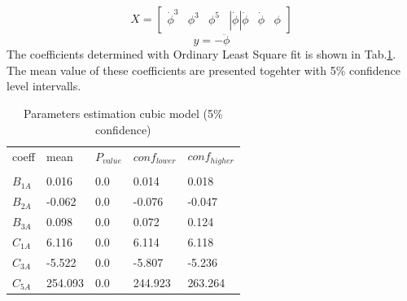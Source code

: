 \begin{equation}
X = \left[\begin{matrix}\dot{\phi}^{3} & \phi^{3} & \phi^{5} & \left|{\dot{\phi}}\right| \dot{\phi} & \dot{\phi} & \phi\end{matrix}\right]
\label{eq:eq_X}
\end{equation}
\begin{equation}
y = - \ddot{\phi}
\label{eq:eq_y}
\end{equation}
The coefficients determined with Ordinary Least Square fit is shown in
Tab.\ref{tab:parameters_one}. The mean value of these
coefficients are presented togehter with 5\% confidence level
intervalls.
\begin{table}[H]
\scriptsize
\center
\caption{Parameters estimation cubic model (5\% confidence)}
\label{tab:parameters_one}
\begin{tabular}{|l|l|l|l|l|}
\hline\addlinespace
coeff & mean & $P_{value}$ & $conf_{lower}$ & $conf_{higher}$\\
&  &  &  & \\
\hline$B_{1A}$ & 0.016 & 0.0 & 0.014 & 0.018\\
$B_{2A}$ & -0.062 & 0.0 & -0.076 & -0.047\\
$B_{3A}$ & 0.098 & 0.0 & 0.072 & 0.124\\
$C_{1A}$ & 6.116 & 0.0 & 6.114 & 6.118\\
$C_{3A}$ & -5.522 & 0.0 & -5.807 & -5.236\\
$C_{5A}$ & 254.093 & 0.0 & 244.923 & 263.264\\
\hline
\end{tabular}
\end{table}

